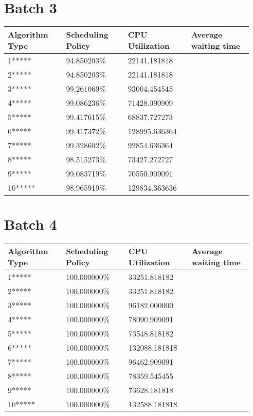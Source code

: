 \documentclass[]{article}
\theoremstyle{definition}
\begin{document}
\section{Batch 3} 
 \begin{adjustwidth}{-2.8cm}{} 
\begin{tabular}{|l|l|l|l|} 
\hline 
Algorithm Type & Scheduling Policy & CPU Utilization & Average waiting time \\ 
\hline 
1***** & 94.850203\% & 22141.181818 \\ 
 \hline 
2***** & 94.850203\% & 22141.181818 \\ 
 \hline 
3***** & 99.261069\% & 93004.454545 \\ 
 \hline 
4***** & 99.086236\% & 71428.090909 \\ 
 \hline 
5***** & 99.417615\% & 68837.727273 \\ 
 \hline 
6***** & 99.417372\% & 128995.636364 \\ 
 \hline 
7***** & 99.328602\% & 92854.636364 \\ 
 \hline 
8***** & 98.515273\% & 73427.272727 \\ 
 \hline 
9***** & 99.083719\% & 70550.909091 \\ 
 \hline 
10***** & 98.965919\% & 129834.363636 \\ 
 \hline 
\end{tabular}
\end{adjustwidth}

\section{Batch 4} 
 \begin{adjustwidth}{-2.8cm}{} 
\begin{tabular}{|l|l|l|l|} 
\hline 
Algorithm Type & Scheduling Policy & CPU Utilization & Average waiting time \\ 
\hline 
1***** & 100.000000\% & 33251.818182 \\ 
 \hline 
2***** & 100.000000\% & 33251.818182 \\ 
 \hline 
3***** & 100.000000\% & 96182.000000 \\ 
 \hline 
4***** & 100.000000\% & 78090.909091 \\ 
 \hline 
5***** & 100.000000\% & 73548.818182 \\ 
 \hline 
6***** & 100.000000\% & 132088.181818 \\ 
 \hline 
7***** & 100.000000\% & 96462.909091 \\ 
 \hline 
8***** & 100.000000\% & 78359.545455 \\ 
 \hline 
9***** & 100.000000\% & 73628.181818 \\ 
 \hline 
10***** & 100.000000\% & 132588.181818 \\ 
 \hline 
\end{tabular}
\end{adjustwidth}
\end{document}
